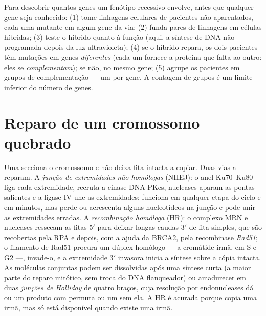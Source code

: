 \begin{method}\label{met:b3:dna-repair:complementation}
Para descobrir quantos genes um fenótipo recessivo envolve, antes que
qualquer gene seja conhecido: (1) tome linhagens celulares de
pacientes não aparentados, cada uma mutante em algum gene da via; (2)
funda pares de linhagens em células híbridas; (3) teste o híbrido
quanto à função (aqui, a síntese de DNA não programada depois da luz
ultravioleta); (4) se o híbrido repara, os dois pacientes têm mutações
em genes \emph{diferentes} (cada um fornece a proteína que falta ao
outro: eles se \emph{complementam}); se não, no mesmo gene; (5)
agrupe os pacientes em grupos de complementação --- um por gene. A
contagem de grupos é um limite inferior do número de genes.
\end{method}

\section{Reparo de um cromossomo quebrado}

\begin{definition}\label{def:b3:dna-repair:dsb}
Uma \emph{} secciona o cromossomo e não deixa fita
intacta a copiar. Duas vias a reparam. A \emph{junção de extremidades
não homólogas} (NHEJ): o anel Ku70--Ku80 liga cada extremidade,
recruta a cinase DNA-PKcs, nucleases aparam as pontas salientes e a
ligase IV une as extremidades; funciona em qualquer etapa do ciclo e
em minutos, mas perde ou acrescenta alguns nucleotídeos na junção e
pode unir as extremidades erradas. A \emph{recombinação homóloga}
(HR): o complexo MRN e nucleases ressecam as fitas 5$'$ para deixar
longas caudas 3$'$ de fita simples, que são recobertas pela RPA e
depois, com a ajuda da BRCA2, pela recombinase \emph{Rad51}; o
filamento de Rad51 procura um dúplex homólogo --- a cromátide irmã, em
S e G2 ---, invade-o, e a extremidade 3$'$ invasora inicia a síntese
sobre a cópia intacta. As moléculas conjuntas podem ser dissolvidas
após uma síntese curta (a maior parte do reparo mitótico, sem troca do
DNA flanqueador) ou amadurecer em duas \emph{junções de Holliday} de
quatro braços, cuja resolução por endonucleases dá ou um produto com
permuta ou um sem ela. A HR é acurada porque copia uma irmã, mas só
está disponível quando existe uma irmã.
\end{definition}


